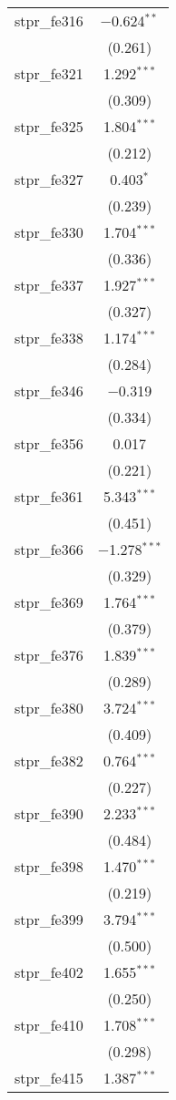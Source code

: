 \begin{table}[!htbp]
\begin{tabular}{@{\extracolsep{5pt}}lc}
  stpr\_fe316 & $-$0.624$^{**}$ \\ 
  & (0.261) \\ 
  stpr\_fe321 & 1.292$^{***}$ \\ 
  & (0.309) \\ 
  stpr\_fe325 & 1.804$^{***}$ \\ 
  & (0.212) \\ 
  stpr\_fe327 & 0.403$^{*}$ \\ 
  & (0.239) \\ 
  stpr\_fe330 & 1.704$^{***}$ \\ 
  & (0.336) \\ 
  stpr\_fe337 & 1.927$^{***}$ \\ 
  & (0.327) \\ 
  stpr\_fe338 & 1.174$^{***}$ \\ 
  & (0.284) \\ 
  stpr\_fe346 & $-$0.319 \\ 
  & (0.334) \\ 
  stpr\_fe356 & 0.017 \\ 
  & (0.221) \\ 
  stpr\_fe361 & 5.343$^{***}$ \\ 
  & (0.451) \\ 
  stpr\_fe366 & $-$1.278$^{***}$ \\ 
  & (0.329) \\ 
  stpr\_fe369 & 1.764$^{***}$ \\ 
  & (0.379) \\ 
  stpr\_fe376 & 1.839$^{***}$ \\ 
  & (0.289) \\ 
  stpr\_fe380 & 3.724$^{***}$ \\ 
  & (0.409) \\ 
  stpr\_fe382 & 0.764$^{***}$ \\ 
  & (0.227) \\ 
  stpr\_fe390 & 2.233$^{***}$ \\ 
  & (0.484) \\ 
  stpr\_fe398 & 1.470$^{***}$ \\ 
  & (0.219) \\ 
  stpr\_fe399 & 3.794$^{***}$ \\ 
  & (0.500) \\ 
  stpr\_fe402 & 1.655$^{***}$ \\ 
  & (0.250) \\ 
  stpr\_fe410 & 1.708$^{***}$ \\ 
  & (0.298) \\ 
  stpr\_fe415 & 1.387$^{***}$ \\ 

\end{tabular}
\end{table}

